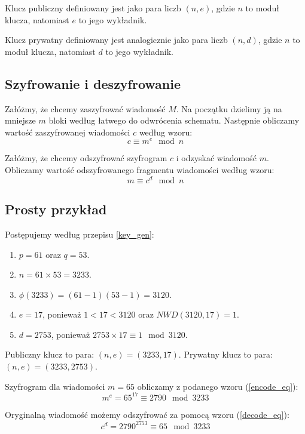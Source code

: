 \documentclass[10pt,a4paper]{article}
\begin{document}
Klucz publiczny definiowany jest jako para liczb $(n, e)$, gdzie $n$ to moduł klucza, natomiast $e$ to jego wykładnik.

Klucz prywatny definiowany jest analogicznie jako para liczb $(n, d)$, gdzie $n$ to moduł klucza, natomiast $d$ to jego wykładnik.

\subsection{Szyfrowanie i deszyfrowanie}
Załóżmy, że chcemy zaszyfrować wiadomość $M$. Na początku dzielimy ją na mniejsze $m$ bloki według łatwego do odwrócenia schematu. Następnie obliczamy wartość zaszyfrowanej wiadomości $c$ według wzoru:
\begin{equation} \label{encode_eq}
c \equiv m^e \mod n
\end{equation} 

Załóżmy, że chcemy odszyfrować szyfrogram $c$ i odzyskać wiadomość $m$. Obliczamy wartość odszyfrowanego fragmentu wiadomości według wzoru:
\begin{equation} \label{decode_eq}
m \equiv c^d \mod n
\end{equation}

\subsection{Prosty przykład}

Postępujemy według przepisu \ref{key_gen}:

\begin{enumerate}
\item $p = 61$ oraz $q = 53$.
\item $n = 61 \times 53 = 3233 $.
\item $\phi(3233) = (61-1)(53-1) = 3120$.
\item $e=17$, ponieważ $1<17<3120$ oraz $NWD(3120, 17) = 1$.
\item $d=2753$, ponieważ $2753 \times 17 \equiv 1 \mod 3120$.
\end{enumerate}

Publiczny klucz to para: $(n, e)=(3233,17)$.
Prywatny klucz to para: $(n, e)=(3233,2753)$.

Szyfrogram dla wiadomości $m = 65$ obliczamy z podanego wzoru (\ref{encode_eq}):
\begin{equation} 
m^e = 65^{17} \equiv 2790 \mod 3233
\end{equation}

Oryginalną wiadomość możemy odszyfrować za pomocą wzoru (\ref{decode_eq}):
\begin{equation} 
c^d = 2790^{2753} \equiv 65 \mod 3233
\end{equation}
\end{document}
